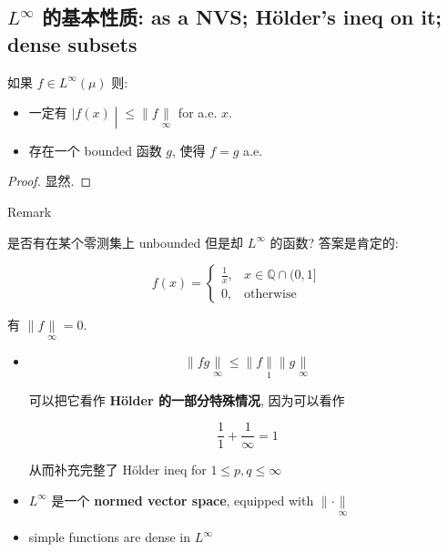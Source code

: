 \documentclass{qlnotes-export}
\begin{document}
\subsection{\texorpdfstring{\(L^{\infty}\) 的基本性质: as a NVS; Hölder's ineq on it; dense subsets}{L\^{}\{\textbackslash infty\} 的基本性质: as a NVS; Hölder's ineq on it; dense subsets}}\label{linfty-ux7684ux57faux672cux6027ux8d28-as-a-nvs-huxf6lders-ineq-on-it-dense-subsets}

\begin{lemma}

如果 \(f \in L^{\infty}(\mu)\) 则:

\begin{itemize}
\item
  一定有 \(\left. |f(x) \middle| \leq \parallel f\underset{\infty}{\parallel} \right.\) for a.e. \(x\).
\item
  存在一个 bounded 函数 \(g\), 使得 \(f = g\) a.e.
\end{itemize}

\end{lemma}

\begin{proof}

显然.

\end{proof}

\begin{qlremark}{Remark}

是否有在某个零测集上 unbounded 但是却 \(L^{\infty}\) 的函数? 答案是肯定的:

\[f(x) = \left\{ \begin{matrix}
{\frac{1}{x},} & {x \in {\mathbb{Q}} \cap (0,1\rbrack} \\
{0,} & \text{otherwise}
\end{matrix} \right.\]

有 \(\parallel f\underset{\infty}{\parallel} = 0\).

\end{qlremark}

\begin{theorem}

\begin{itemize}
\item
  \[\parallel fg\underset{\infty}{\parallel} \leq \parallel f\underset{1}{\parallel} \parallel g\underset{\infty}{\parallel}\]

  可以把它看作 \textbf{Hölder 的一部分特殊情况}, 因为可以看作

  \[\frac{1}{1} + \frac{1}{\infty} = 1\]

  从而补充完整了 Hölder ineq for \(1 \leq p,q \leq \infty\)
\item
  \(L^{\infty}\) 是一个 \textbf{normed vector space}, equipped with \(\parallel \cdot \underset{\infty}{\parallel}\)
\item
  simple functions are dense in \(L^{\infty}\)
\end{itemize}

\end{theorem}
\end{document}
